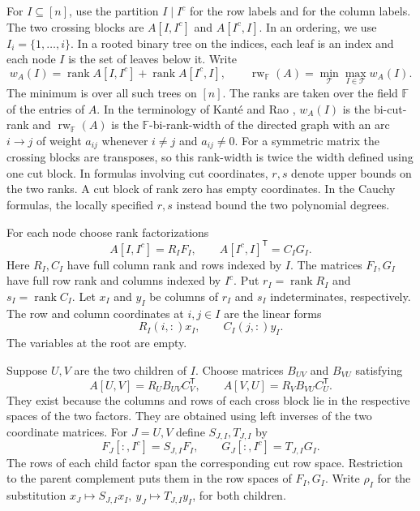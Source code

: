 \documentclass[11pt,reqno]{amsart}
\theoremstyle{remark}
\numberwithin{equation}{section}
\newcommand{\rk}{\operatorname{rank}}
\newcommand{\F}{\mathbb F}
\begin{document}
For \(I\subseteq[n]\), use the partition \(I\mid I^c\) for the
row labels and for the column labels. The two crossing blocks are
\(A[I,I^c]\) and \(A[I^c,I]\). In an ordering, we use
\(I_i=\{1,\ldots,i\}\).
In a rooted binary tree on the indices, each leaf is an index
and each node \(I\) is the set of leaves below it. Write
\begin{equation}\label{eq:rank-width}
 w_A(I)=\rk A[I,I^c]+\rk A[I^c,I],
 \qquad
 \operatorname{rw}_{\F}(A)=\min_{\mathcal T}\max_{I\in\mathcal T}w_A(I).
\end{equation}
The minimum is over all such trees on \([n]\). The ranks are taken
over the field \(\F\) of the entries of \(A\). In the terminology
of Kant\'e and Rao \cite[Definitions 4.1 and 4.3]{KanteRao}, \(w_A(I)\) is the
bi-cut-rank and \(\operatorname{rw}_{\F}(A)\) is the
\(\F\)-bi-rank-width of the directed graph with an arc \(i\to j\)
of weight \(a_{ij}\) whenever \(i\ne j\) and \(a_{ij}\ne0\).
For a symmetric matrix the crossing blocks are
transposes, so this rank-width is twice the width defined using one
cut block. In formulas involving cut coordinates, \(r,s\)
denote upper bounds on the two ranks. A cut block of rank zero has
empty coordinates. In the Cauchy formulas, the locally specified
\(r,s\) instead bound the two polynomial degrees.

For each node choose rank factorizations
\begin{equation}\label{eq:tree-factors}
 A[I,I^c]=R_I F_I,\qquad A[I^c,I]^{\mathsf T}=C_I G_I .
\end{equation}
Here \(R_I,C_I\) have full column rank and rows indexed by \(I\).
The matrices \(F_I,G_I\) have full row rank and columns indexed by
\(I^c\). Put \(r_I=\rk R_I\) and \(s_I=\rk C_I\).
Let \(x_I\) and \(y_I\) be columns of \(r_I\) and \(s_I\)
indeterminates, respectively. The row and column
coordinates at \(i,j\in I\) are the linear forms
\[
 R_I(i,:)x_I,\qquad C_I(j,:)y_I .
\]
The variables at the root are empty.

Suppose \(U,V\) are the two children of \(I\). Choose matrices \(B_{UV}\)
and \(B_{VU}\) satisfying
\begin{equation}\label{eq:coupling}
 A[U,V]=R_U B_{UV} C_V^{\mathsf T},\qquad
 A[V,U]=R_V B_{VU} C_U^{\mathsf T}.
\end{equation}
They exist because the columns and rows of each cross block lie
in the respective spaces of the two factors. They are obtained
using left inverses of the two coordinate matrices.
For \(J=U,V\) define \(S_{J,I},T_{J,I}\) by
\[
 F_J[:,I^c]=S_{J,I}F_I,\qquad
 G_J[:,I^c]=T_{J,I}G_I .
\]
The rows of each child factor span the corresponding cut row
space. Restriction to the parent complement puts them in the
row spaces of \(F_I,G_I\). Write \(\rho_I\) for the substitution
\(x_J\mapsto S_{J,I}x_I,\ y_J\mapsto T_{J,I}y_I\), for both children.
\end{document}
